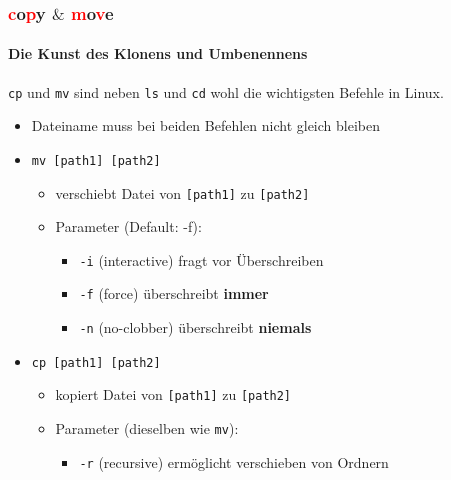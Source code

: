 \documentclass[12pt,utf8]{beamer}
\begin{document}

\begin{frame}
\frametitle{\textcolor{red}{c}o\textcolor{red}{p}y $\&$ \textcolor{red}{m}o\textcolor{red}{v}e}
\framesubtitle{\textcolor{ownDarkOr}{Die Kunst des Klonens und Umbenennens}}
\texttt{cp} und \texttt{mv} sind neben \texttt{ls} und \texttt{cd} wohl die wichtigsten Befehle in Linux.
\begin{itemize}
	\item Dateiname muss bei beiden Befehlen nicht gleich bleiben
	\item \texttt{mv [path1] [path2]}
	\begin{itemize}
		\item verschiebt Datei von \texttt{[path1]} zu \texttt{[path2]}
		\item Parameter (Default: -f):
		\begin{itemize}[<+->]
			\item {\scriptsize \texttt{-i} (interactive) fragt vor Überschreiben}
			\item {\scriptsize \texttt{-f} (force) überschreibt \textbf{immer}}
			\item {\scriptsize \texttt{-n} (no-clobber) überschreibt \textbf{niemals}}
		\end{itemize}
	\end{itemize}
	\item \texttt{cp [path1] [path2]}
	\begin{itemize}
		\item kopiert Datei von \texttt{[path1]} zu \texttt{[path2]}
		\item Parameter {\scriptsize (dieselben wie \texttt{mv})}:
		\begin{itemize}[<+->]
			\item {\scriptsize \texttt{-r} (recursive) ermöglicht verschieben von Ordnern}
		\end{itemize}
	\end{itemize}
\end{itemize}
\end{frame}
\end{document}
